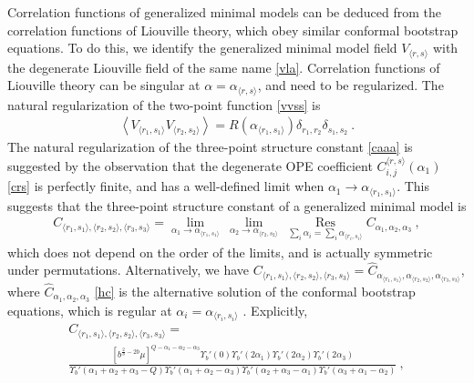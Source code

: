 \documentclass[12pt,a4paper,notitlepage]{report}
\numberwithin{equation}{section}
\theoremstyle{break}
\begin{document}
Correlation functions of generalized minimal models can be deduced from the correlation functions of Liouville theory, which obey similar conformal bootstrap equations.
To do this, we identify the generalized minimal model field $V_{\langle r,s \rangle}$ with the degenerate Liouville field of the same name \eqref{vla}. 
Correlation functions of Liouville theory can be singular at $\alpha = \alpha_{\langle r,s \rangle}$, and need to be regularized.
The natural regularization of the two-point function \eqref{vvss} is
\begin{align}
 \boxed{\left\langle V_{\langle r_1,s_1 \rangle} V_{\langle r_2,s_2 \rangle} \right\rangle = R(\alpha_{\langle r_1,s_1 \rangle}) \delta_{r_1,r_2} \delta_{s_1,s_2}}\ .
\label{vvdd}
\end{align}
The natural regularization of the three-point structure constant \eqref{caaa} is suggested by the observation that the degenerate OPE coefficient $C_{i,j}^{\langle r,s \rangle}(\alpha_1)$ \eqref{crs} is perfectly finite, and has a well-defined limit when $\alpha_1\rightarrow \alpha_{\langle r_1,s_1 \rangle}$.
This suggests that the three-point structure constant of a generalized minimal model is 
\begin{align}
 C_{\langle r_1,s_1\rangle ,\langle r_2,s_2\rangle ,\langle r_3,s_3 \rangle} = \underset{\alpha_1\rightarrow \alpha_{\langle r_1,s_1 \rangle}}{\lim}\ 
\underset{\alpha_2\rightarrow \alpha_{\langle r_2,s_2 \rangle}}{\lim}\ 
\underset{\sum_i \alpha_i = \sum_i \alpha_{\langle r_i,s_i \rangle} }{\operatorname{ Res}} C_{\alpha_1,\alpha_2,\alpha_3}\ ,
\end{align}
which does not depend on the order of the limits, and is actually symmetric under permutations. 
Alternatively, we have $C_{\langle r_1,s_1\rangle ,\langle r_2,s_2\rangle ,\langle r_3,s_3 \rangle} = \hat{C}_{\alpha_{\langle r_1,s_1 \rangle}, \alpha_{\langle r_2,s_2 \rangle},\alpha_{\langle r_3,s_3 \rangle}}$, where $\hat{C}_{\alpha_1,\alpha_2,\alpha_3}$ \eqref{hc} is
the alternative solution of the conformal bootstrap equations, which is regular at $\alpha_i=\alpha_{\langle r_i,s_i \rangle}$ \cite{zam05}.
Explicitly,
\begin{multline}
C_{\langle r_1,s_1\rangle ,\langle r_2,s_2\rangle ,\langle r_3,s_3 \rangle} =  
\\
\frac{\left[b^{\frac{2}{b}-2b}\mu\right]^{Q-\alpha_1-\alpha_2-\alpha_3}\Upsilon_b'(0) \Upsilon_b'(2\alpha_1) \Upsilon_b'(2\alpha_2) \Upsilon_b'(2\alpha_3)}{\Upsilon_b'(\alpha_1+\alpha_2+\alpha_3-Q) \Upsilon_b'(\alpha_1+\alpha_2-\alpha_3)\Upsilon_b'(\alpha_2+\alpha_3-\alpha_1)\Upsilon_b'(\alpha_3+\alpha_1-\alpha_2)}\ ,
\label{crisi}
\end{multline}
\end{document}
